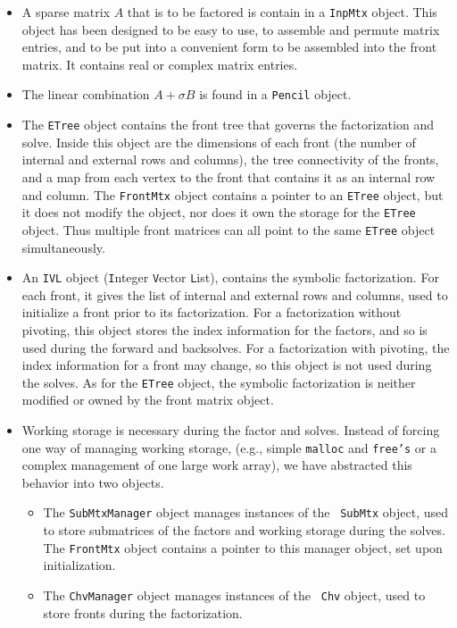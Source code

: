 \begin{itemize}
\item
A sparse matrix $A$ that is to be factored is contain in a 
{\tt InpMtx} object. 
This object has been designed to be easy to use, to assemble 
and permute matrix entries, and to be put into a convenient form to
be assembled into the front matrix.
It contains real or complex matrix entries.
\item
The linear combination $A + \sigma B$ is found in a {\tt Pencil}
object.
\item
The {\tt ETree} object contains the front
tree that governs the factorization and solve.
Inside this object are the dimensions of each front (the number of
internal and external rows and columns), the tree connectivity of
the fronts, and a map from each vertex to the front that contains
it as an internal row and column.
The {\tt FrontMtx} object contains a pointer to an {\tt ETree}
object, but it does not modify the object, nor does it own the
storage for the {\tt ETree} object.
Thus multiple front matrices can all point to the same {\tt ETree}
object simultaneously.
\item
An {\tt IVL} object ({\tt I}nteger {\tt V}ector {\tt L}ist),
contains the symbolic factorization.
For each front, it gives the list of internal and external rows and
columns, used to initialize a front prior to its factorization.
For a factorization without pivoting, this object stores the index
information for the factors, and so is used during the forward and
backsolves.
For a factorization with pivoting, the index information for a
front may change, so this object is not used during the solves.
As for the {\tt ETree} object, the symbolic factorization is
neither modified or owned by the front matrix object.
\item
Working storage is necessary during the factor and solves.
Instead of forcing one way of managing working storage,
(e.g., simple {\tt malloc} and {\tt free's} or a complex management
of one large work array), we have abstracted this behavior into two
objects.
\begin{itemize}
\item
The {\tt SubMtxManager} object manages instances of the {\tt
SubMtx} object, used to store submatrices of the factors and
working storage during the solves.
The {\tt FrontMtx} object contains a pointer to this manager
object, set upon initialization.
\item
The {\tt ChvManager} object manages instances of the {\tt
Chv} object, used to store fronts during the factorization.

\end{itemize}
\end{itemize}
